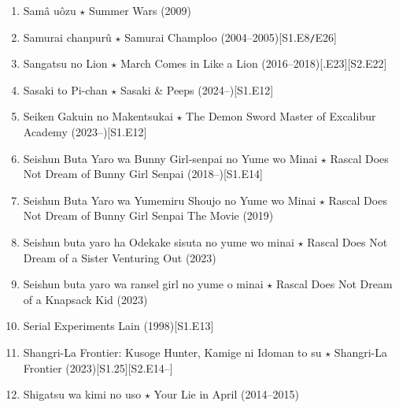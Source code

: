 \documentclass{article}
\begin{document}
\begin{enumerate}
    \item {\sc Samâ uôzu $\star$ Summer Wars} (2009)
    \item Samurai chanpurû $\star$ Samurai Champloo (2004--2005)\hfill[S1.E8{\tt/}E26]
    \item {\sc Sangatsu no Lion $\star$ March Comes in Like a Lion} (2016--2018)\hfill[.E23][S2.E22]
    \item {\sc Sasaki to Pi-chan $\star$ Sasaki \& Peeps} (2024--)\hfill[S1.E12]
    \item {\sc Seiken Gakuin no Makentsukai $\star$ The Demon Sword Master of Excalibur Academy} (2023--)\hfill[S1.E12]
    \item {\sc Seishun Buta Yaro wa Bunny Girl-senpai no Yume wo Minai $\star$ Rascal Does Not Dream of Bunny Girl Senpai} (2018--)\hfill[S1.E14]
    \item {\sc Seishun Buta Yaro wa Yumemiru Shoujo no Yume wo Minai $\star$ Rascal Does Not Dream of Bunny Girl Senpai The Movie} (2019)
    \item {\sc Seishun buta yaro ha Odekake sisuta no yume wo minai $\star$ Rascal Does Not Dream of a Sister Venturing Out} (2023)
    \item {\sc Seishun buta yaro wa ransel girl no yume o minai $\star$ Rascal Does Not Dream of a Knapsack Kid} (2023)
    \item {\sc Serial Experiments Lain} (1998)\hfill[S1.E13]
    \item {\sc Shangri-La Frontier: Kusoge Hunter, Kamige ni Idoman to su $\star$ Shangri-La Frontier} (2023)\hfill[S1.25][S2.E14--]
    \item {\sc Shigatsu wa kimi no uso $\star$ Your Lie in April} (2014--2015)
    

\end{enumerate}
\end{document}
